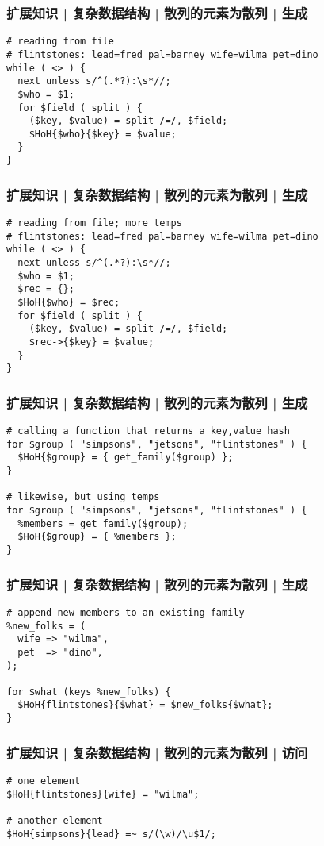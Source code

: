 \begin{frame}[fragile]
  \frametitle{扩展知识 | 复杂数据结构 | 散列的元素为散列 | 生成}
\begin{lstlisting}
# reading from file
# flintstones: lead=fred pal=barney wife=wilma pet=dino
while ( <> ) {
  next unless s/^(.*?):\s*//;
  $who = $1;
  for $field ( split ) {
    ($key, $value) = split /=/, $field;
    $HoH{$who}{$key} = $value;
  }
}
\end{lstlisting}
\end{frame}

\begin{frame}[fragile]
  \frametitle{扩展知识 | 复杂数据结构 | 散列的元素为散列 | 生成}
\begin{lstlisting}
# reading from file; more temps
# flintstones: lead=fred pal=barney wife=wilma pet=dino
while ( <> ) {
  next unless s/^(.*?):\s*//;
  $who = $1;
  $rec = {};
  $HoH{$who} = $rec;
  for $field ( split ) {
    ($key, $value) = split /=/, $field;
    $rec->{$key} = $value;
  }
}
\end{lstlisting}
\end{frame}

\begin{frame}[fragile]
  \frametitle{扩展知识 | 复杂数据结构 | 散列的元素为散列 | 生成}
\begin{lstlisting}
# calling a function that returns a key,value hash
for $group ( "simpsons", "jetsons", "flintstones" ) {
  $HoH{$group} = { get_family($group) };
}

# likewise, but using temps
for $group ( "simpsons", "jetsons", "flintstones" ) {
  %members = get_family($group);
  $HoH{$group} = { %members };
}
\end{lstlisting}
\end{frame}

\begin{frame}[fragile]
  \frametitle{扩展知识 | 复杂数据结构 | 散列的元素为散列 | 生成}
\begin{lstlisting}
# append new members to an existing family
%new_folks = (
  wife => "wilma",
  pet  => "dino",
);

for $what (keys %new_folks) {
  $HoH{flintstones}{$what} = $new_folks{$what};
}
\end{lstlisting}
\end{frame}

\begin{frame}[fragile]
  \frametitle{扩展知识 | 复杂数据结构 | 散列的元素为散列 | 访问}
\begin{lstlisting}
# one element
$HoH{flintstones}{wife} = "wilma";

# another element
$HoH{simpsons}{lead} =~ s/(\w)/\u$1/;
\end{lstlisting}
\end{frame}

